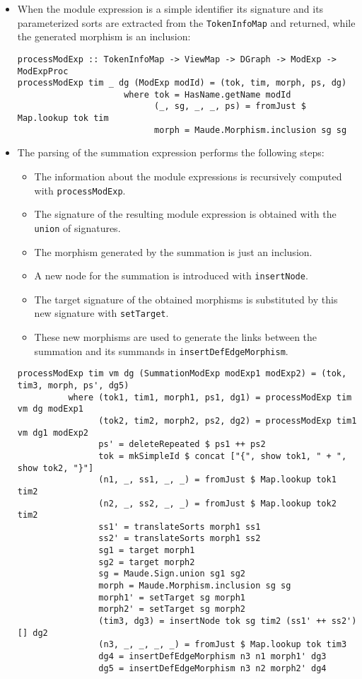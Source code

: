 \begin{itemize}
\item When the module expression is a simple identifier its signature
and its parameterized sorts are extracted from the \verb"TokenInfoMap"
and returned, while the generated morphism is an inclusion:

{\codesize
\begin{verbatim}
processModExp :: TokenInfoMap -> ViewMap -> DGraph -> ModExp -> ModExpProc
processModExp tim _ dg (ModExp modId) = (tok, tim, morph, ps, dg)
                     where tok = HasName.getName modId
                           (_, sg, _, _, ps) = fromJust $ Map.lookup tok tim
                           morph = Maude.Morphism.inclusion sg sg
\end{verbatim}
}

\item The parsing of the summation expression performs the following
steps:

\begin{itemize}
\item The information about the module expressions is recursively
computed with \verb"processModExp".
\item The signature of the resulting module expression is obtained
with the \verb"union" of signatures.
\item The morphism generated by the summation is just an inclusion.
\item A new node for the summation is introduced with \verb"insertNode".
\item The target signature of the obtained morphisms is substituted
by this new signature with \verb"setTarget".
\item These new morphisms are used to generate the links between the
summation and its summands in \verb"insertDefEdgeMorphism".
\end{itemize}

{\codesize
\begin{verbatim}
processModExp tim vm dg (SummationModExp modExp1 modExp2) = (tok, tim3, morph, ps', dg5)
          where (tok1, tim1, morph1, ps1, dg1) = processModExp tim vm dg modExp1
                (tok2, tim2, morph2, ps2, dg2) = processModExp tim1 vm dg1 modExp2
                ps' = deleteRepeated $ ps1 ++ ps2
                tok = mkSimpleId $ concat ["{", show tok1, " + ", show tok2, "}"]
                (n1, _, ss1, _, _) = fromJust $ Map.lookup tok1 tim2
                (n2, _, ss2, _, _) = fromJust $ Map.lookup tok2 tim2
                ss1' = translateSorts morph1 ss1
                ss2' = translateSorts morph1 ss2
                sg1 = target morph1
                sg2 = target morph2
                sg = Maude.Sign.union sg1 sg2
                morph = Maude.Morphism.inclusion sg sg
                morph1' = setTarget sg morph1
                morph2' = setTarget sg morph2
                (tim3, dg3) = insertNode tok sg tim2 (ss1' ++ ss2') [] dg2
                (n3, _, _, _, _) = fromJust $ Map.lookup tok tim3
                dg4 = insertDefEdgeMorphism n3 n1 morph1' dg3
                dg5 = insertDefEdgeMorphism n3 n2 morph2' dg4
\end{verbatim}
}


\end{itemize}
